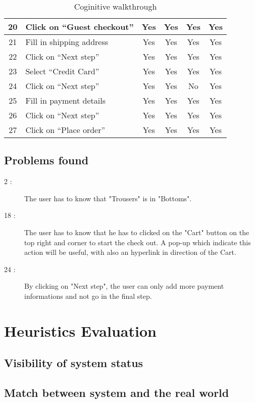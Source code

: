 \documentclass[fontsize=12pt,paper=a4]{scrartcl}
\begin{document}
\begin{table}[htdp]
\begin{center}
\begin{tabular}{|c|l|c|c|c|c|}
\hline
20 & Click on ``Guest checkout'' & Yes & Yes & Yes & Yes\\
\hline
21 & Fill in shipping address & Yes & Yes & Yes & Yes\\
\hline
22 & Click on ``Next step'' & Yes & Yes & Yes & Yes\\
\hline
23 & Select ``Credit Card'' & Yes & Yes & Yes & Yes\\
\hline
24 & Click on ``Next step'' & Yes & Yes & No & Yes\\
\hline
25 & Fill in payment details & Yes & Yes & Yes & Yes\\
\hline
26 & Click on ``Next step'' & Yes & Yes & Yes & Yes\\
\hline
27 & Click on ``Place order'' & Yes & Yes & Yes & Yes\\
\hline
\end{tabular}
\end{center}
\label{Coginitive_walkthrough}
\caption{Coginitive walkthrough}
\end{table}%

\subsection{Problems found}
\begin{description}
\item[2 :] The user has to know that "Trousers" is in "Bottoms". 
\item[18 :] The user has to know that he has to clicked on the "Cart" button on the top right and corner to start the check out. A pop-up which indicate this action will be useful, with also an hyperlink in direction of the Cart.
\item[24 :] By clicking on "Next step", the user can only add more payment informations and not go in the final step.
\end{description}

\section{Heuristics Evaluation}

\subsection{Visibility of system status}

\subsection{Match between system and the real world}
\end{document}

